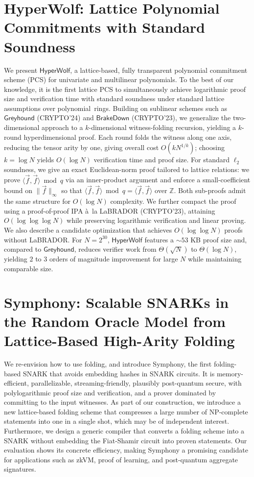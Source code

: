 \documentclass[11pt,oneside]{book}
\theoremstyle{definition}
\theoremstyle{remark}
\theoremstyle{plain}
\begin{document}
\section{\cite{cryptoeprint:2025/1903} HyperWolf: Lattice Polynomial Commitments with Standard Soundness}
We present $\mathsf{HyperWolf}$, a lattice-based, fully transparent polynomial commitment scheme (PCS) for univariate and multilinear polynomials. To the best of our knowledge, it is the first lattice PCS to simultaneously achieve logarithmic proof size and verification time with standard soundness under standard lattice assumptions over polynomial~rings. Building on sublinear schemes such as $\mathsf{Greyhound}$ (CRYPTO'24) and $\mathsf{BrakeDown}$ (CRYPTO'23), we generalize the two-dimensional approach to a $k$-dimensional witness-folding recursion, yielding a $k$-round hyperdimensional proof. Each round folds the witness along one axis, reducing the tensor arity by one, giving overall cost $O(k N^{1/k})$; choosing $k = \log N$ yields $O(\log N)$ verification time and proof size. For standard $\ell_2$ soundness, we give an exact Euclidean-norm proof tailored to lattice relations: we prove $\langle \vec{f}, \vec{f}\rangle \bmod q$ via an inner-product argument and enforce a small-coefficient bound on $\|\vec{f}\|_\infty$ so that $\langle \vec{f}, \vec{f}\rangle \bmod q = \langle \vec{f}, \vec{f}\rangle$ over $\mathbb{Z}$. Both sub-proofs admit the same structure for $O(\log N)$ complexity. We further compact the proof using a proof-of-proof IPA \`{a}~la LaBRADOR (CRYPTO'23), attaining $O(\log\log\log{N})$ while preserving logarithmic verification and linear proving. We also describe a candidate optimization that achieves $O(\log\log N)$ proofs without LaBRADOR. For $N = 2^{30}$, $\mathsf{HyperWolf}$ features a ${\sim}53$ KB proof size and, compared to $\mathsf{Greyhound}$, reduces verifier work from $\Theta(\sqrt{N})$ to $\Theta(\log N)$, yielding $2$ to $3$ orders of magnitude improvement for large $N$ while maintaining comparable size.

\section{\cite{cryptoeprint:2025/1905} Symphony: Scalable SNARKs in the Random Oracle Model from Lattice-Based High-Arity Folding}
We re-envision how to use folding, and introduce Symphony, the first folding-based SNARK that avoids embedding hashes in SNARK circuits. It is memory-efficient, parallelizable, streaming-friendly, plausibly post-quantum secure, with polylogarithmic proof size and verification, and a prover dominated by committing to the input witnesses. As part of our construction, we introduce a new lattice-based folding scheme that compresses a large number of NP-complete statements into one in a single shot, which may be of independent interest. Furthermore, we design a generic compiler that converts a folding scheme into a SNARK without embedding the Fiat-Shamir circuit into proven statements. Our evaluation shows its concrete efficiency, making Symphony a promising candidate for applications such as zkVM, proof of learning, and post-quantum aggregate signatures.
\end{document}
